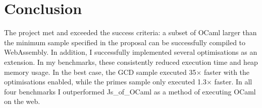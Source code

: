 \chapter{Conclusion}


The project met and exceeded the success criteria: a subset of OCaml larger than the minimum sample specified in the proposal can be successfully compiled to WebAssembly. In addition, I successfully implemented several optimisations as an extension. In my benchmarks, these consistently reduced execution time and heap memory usage. In the best case, the GCD sample executed 35$\times$ faster with the optimisations enabled, while the primes sample only executed 1.3$\times$ faster. In all four benchmarks I outperformed Js\_of\_OCaml as a method of executing OCaml on the web.



